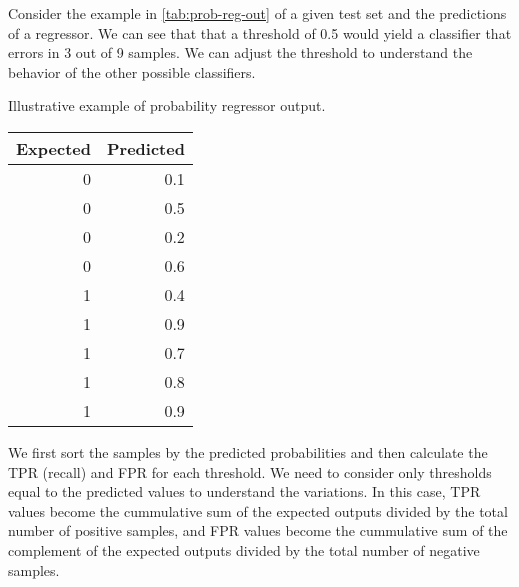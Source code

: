 Consider the example in \cref{tab:prob-reg-out} of a given test set and the predictions of
a regressor. We can see that that a threshold of 0.5 would yield a classifier that errors
in 3 out of 9 samples.  We can adjust the threshold to understand the behavior of the
other possible classifiers.

\begin{tablebox}[label=tab:prob-reg-out]{Illustrative example of probability regressor
  output.}
  \centering
  \begin{tabular}{rr}
    \toprule
    \textbf{Expected} & \textbf{Predicted} \\
    \midrule
    0 & 0.1  \\
    0 & 0.5  \\
    0 & 0.2  \\
    0 & 0.6  \\
    1 & 0.4  \\
    1 & 0.9  \\
    1 & 0.7  \\
    1 & 0.8  \\
    1 & 0.9  \\
    \bottomrule
  \end{tabular}
\end{tablebox}

We first sort the samples by the predicted probabilities and then calculate the TPR
(recall) and FPR for each threshold.  We need to consider only thresholds equal to the
predicted values to understand the variations.  In this case, TPR values become the
cummulative sum of the expected outputs divided by the total number of positive samples,
and FPR values become the cummulative sum of the complement of the expected outputs
divided by the total number of negative samples.

